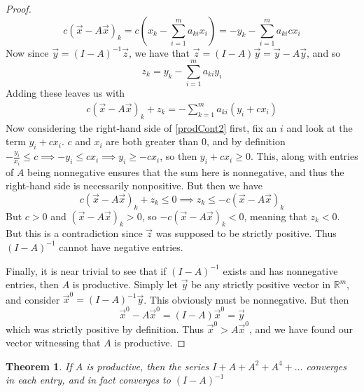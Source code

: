 \documentclass{article}
\theoremstyle{definition}
\theoremstyle{plain}
\theoremstyle{theorem}
\newtheorem{theorem}{Theorem}[section]
\begin{document}
\begin{proof}
\[ c(\vec{x} - A\vec{x})_k = c(x_k - \sum_{i=1}^m a_{ki}x_i) = -y_k - \sum_{i=1}^m a_{ki} cx_i \] 
Now since $\vec{y} = (I-A)^{-1}\vec{z}$, we have that $\vec{z} = (I-A)\vec{y} = \vec{y} - A\vec{y}$, and so 
\[ z_k = y_k - \sum_{i=1}^m a_{ki} y_i \]
Adding these leaves us with
\begin{align}
	c(\vec{x} - A\vec{x})_k+z_k = -\sum_{k=1}^m a_{ki}(y_i+cx_i) \label{prodCont2}
\end{align}
Now considering the right-hand side of \ref{prodCont2} first, fix an $i$ and look at the term $y_i+cx_i$. $c$ and $x_i$ are both greater than $0$, and by definition $-\frac{y_i}{x_i} \leq c \implies -y_i \leq cx_i \implies y_i \geq -cx_i$, so then $y_i+cx_i \geq 0$. This, along with entries of $A$ being nonnegative ensures that the sum here is nonnegative, and thus the right-hand side is necessarily nonpositive. But then we have
\[ c(\vec{x} - A\vec{x})_k+z_k \leq 0 \implies z_k \leq -c(\vec{x} - A\vec{x})_k \]
But $c > 0$ and $(\vec{x} - A\vec{x})_k > 0$, so $-c(\vec{x} - A\vec{x})_k < 0$, meaning that $z_k < 0$. But this is a contradiction since $\vec{z}$ was supposed to be strictly positive. Thus $(I-A)^{-1}$ cannot have negative entries. \par 
Finally, it is near trivial to see that if $(I-A)^{-1}$ exists and has nonnegative entries, then $A$ is productive. Simply let $\vec{y}$ be any strictly positive vector in $\mathbb{R}^m$, and consider $\vec{x}^0 = (I-A)^{-1}\vec{y}$. This obviously must be nonnegative. But then 
\[ \vec{x}^0 - A\vec{x}^0 = (I-A)\vec{x}^0 = \vec{y} \]
which was strictly positive by definition. Thus $\vec{x}^0 > A\vec{x}^0$, and we have found our vector witnessing that $A$ is productive. 
\end{proof}
\begin{theorem}
	 If $A$ is productive, then the series $I+A+A^2+A^4 + \ldots$ converges in each entry, and in fact converges to $(I-A)^{-1}$ 
\end{theorem}
\end{document}
